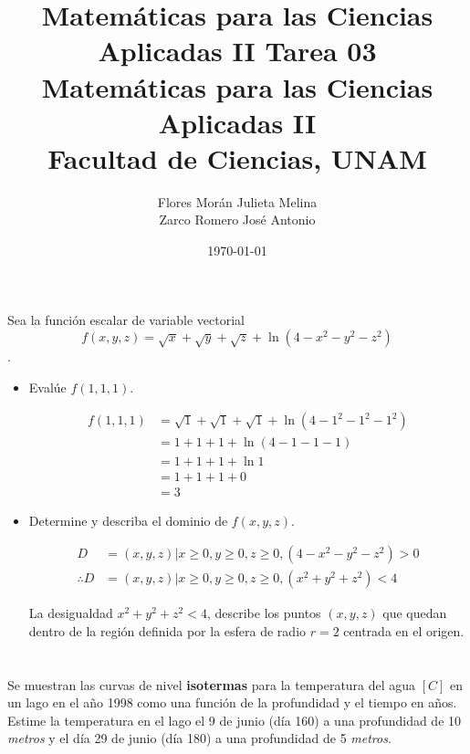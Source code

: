 \documentclass[12pt]{article}
\title{Matemáticas para las Ciencias Aplicadas II}
\title{
        \textbf{Tarea 03} \\
        \vspace{1ex}
        \large Matemáticas para las Ciencias Aplicadas II \\
        Facultad de Ciencias, UNAM}
\date{\today}
\author{Flores Morán Julieta Melina \\ Zarco Romero José Antonio}
\begin{document}
\maketitle

\section{}

Sea la función escalar de variable vectorial $$f(x,y,z)= \sqrt{x} +\sqrt{y} +\sqrt{z} + \ln{(4-x^2-y^2-z^2)}$$.

\begin{itemize}[format=\textbf]

\item Evalúe $f(1,1,1)$.

\begin{align*}
f(1,1,1)
&= \sqrt{1} +\sqrt{1} +\sqrt{1} + \ln{(4-1^2-1^2-1^2)} \\
&= 1+1+1+ \ln{(4-1-1-1)} \\
&= 1+1+1+ \ln{1} \\
&= 1+1+1+0 \\
&= 3
\end{align*}

\item Determine y describa el dominio de $f(x, y, z)$.

\begin{align*}
D
&={(x,y,z)|x \geq 0, y \geq 0, z \geq 0, (4-x^2-y^2-z^2) > 0} \\
\therefore D
&= {(x,y,z)|x \geq 0, y \geq 0, z \geq 0, (x^2+y^2+z^2) < 4}
\end{align*}

La desigualdad $x^2+y^2+z^2<4$, describe los puntos $(x,y,z)$ que quedan dentro de la región definida por la esfera de radio $r=2$ centrada en el origen.

\end{itemize}

\section{}

 Se muestran las curvas de nivel \textbf{isotermas} para la temperatura del agua $[C]$ en un lago en el año 1998 como una función de la profundidad y el tiempo en años. Estime la temperatura en el lago el 9 de junio (día 160) a una profundidad de 10 \textit{metros} y el día 29 de junio (día 180) a una profundidad de 5 \textit{metros}.
\end{document}
